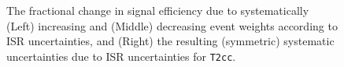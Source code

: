 \begin{figure}[h!]
\begin{center}
{    }
    \\
    \\
    \caption{\label{fig:sms-isr-t2cc}The fractional change in signal
      efficiency due to systematically (Left) increasing and (Middle)
      decreasing event weights according to ISR uncertainties, and
      (Right) the resulting (symmetric) systematic uncertainties due
      to ISR uncertainties for \texttt{T2cc}.}
  \end{center}
\end{figure}

